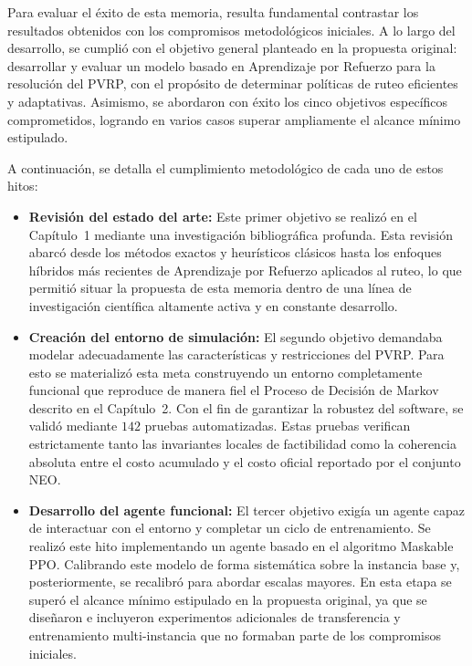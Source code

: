 Para evaluar el éxito de esta memoria, resulta fundamental contrastar los resultados obtenidos con los compromisos metodológicos iniciales. A lo largo del desarrollo, se cumplió con el objetivo general planteado en la propuesta original: desarrollar y evaluar un modelo basado en Aprendizaje por Refuerzo para la resolución del PVRP, con el propósito de determinar políticas de ruteo eficientes y adaptativas. Asimismo, se abordaron con éxito los cinco objetivos específicos comprometidos, logrando en varios casos superar ampliamente el alcance mínimo estipulado.

A continuación, se detalla el cumplimiento metodológico de cada uno de estos hitos:

\begin{itemize}
    \item \textbf{Revisión del estado del arte:} Este primer objetivo se realizó en el Capítulo~1 mediante una investigación bibliográfica profunda. Esta revisión abarcó desde los métodos exactos y heurísticos clásicos hasta los enfoques híbridos más recientes de Aprendizaje por Refuerzo aplicados al ruteo, lo que permitió situar la propuesta de esta memoria dentro de una línea de investigación científica altamente activa y en constante desarrollo.
    
    \item \textbf{Creación del entorno de simulación:} El segundo objetivo demandaba modelar adecuadamente las características y restricciones del PVRP. Para esto se materializó esta meta construyendo un entorno completamente funcional que reproduce de manera fiel el Proceso de Decisión de Markov descrito en el Capítulo~2. Con el fin de garantizar la robustez del software, se validó mediante $142$ pruebas automatizadas. Estas pruebas verifican estrictamente tanto las invariantes locales de factibilidad como la coherencia absoluta entre el costo acumulado y el costo oficial reportado por el conjunto NEO.
    
    \item \textbf{Desarrollo del agente funcional:} El tercer objetivo exigía un agente capaz de interactuar con el entorno y completar un ciclo de entrenamiento. Se realizó este hito implementando un agente basado en el algoritmo Maskable PPO. Calibrando este modelo de forma sistemática sobre la instancia base y, posteriormente, se recalibró para abordar escalas mayores. En esta etapa se superó el alcance mínimo estipulado en la propuesta original, ya que se diseñaron e incluyeron experimentos adicionales de transferencia y entrenamiento multi-instancia que no formaban parte de los compromisos iniciales.
    

\end{itemize}
